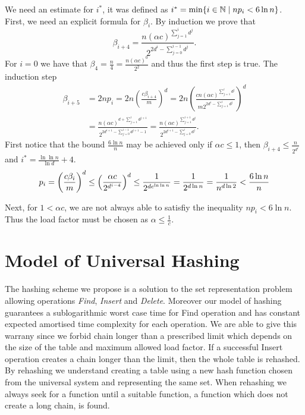 We need an estimate for $i^*$, it was defined as $i^* = \displaystyle\min \{i \in \mathbb{N} \mid np_i < 6 \ln n\}$. First, we need an explicit formula for $\beta_i$. By induction we prove that $$\beta_{i + 4} = \frac{n \left(\alpha c\right) ^ {\sum_{j = 1}^{i}d ^ j}}{2 ^ {2 d ^ i - \sum_{j = 0}^{i - 1}{d ^ j}}} \textit{.}$$
For $i = 0$ we have that $\beta_4 = \frac{n}{4} = \frac{n\left(\alpha c\right) ^ 0}{2 ^ {2}}$ and thus the first step is true. The induction step
\[
\begin{split}
\beta_{i + 5} 
	& = 2np_i = 2n \left(\frac{c\beta_{i + 4}}{m}\right) ^ d = 2n \left(\frac{cn\left(\alpha c\right) ^ {\sum_{j = 1}^{i}d ^ j}}{m 2 ^ {2 d ^ i - \sum_{j = 1}^{i}d^j}}\right) ^ d \\
	& = \frac{n\left(\alpha c\right) ^ {d + \sum_{j = 1}^{i} d ^ {j + 1}}}{2 ^ {2d ^ {i + 1} - \sum_{j = 0}^{i  -1} d ^ {j + 1} - 1}} = \frac{n \left(\alpha c\right) ^ {\sum_{j = 1}^{i + 1} d ^ j}}{2 ^ {2d ^ {i + 1} - \sum_{j = 0}^{i} d ^ j}} \textit{.}
\end{split}
\]
First notice that the bound $\frac{6 \ln n}{n}$ may be achieved only if $\alpha c \leq 1$, then $\beta_{i + 4} \leq \frac{n}{2 ^ {d ^ i}}$ and $i^* = \frac{\ln \ln n}{\ln d} + 4$.
\[
p_i = \left(\frac{c\beta_i}{m}\right) ^ d \leq \left(\frac{\alpha c}{2 ^ {d ^ {i - 4}}}\right) ^ d \leq \frac{1}{2 ^ {de^{\ln \ln n}}} = \frac{1}{2 ^ {d \ln n}} = \frac{1}{n ^ {d \ln 2}} < \frac{6 \ln n}{n}\\
\]

Next, for $1 < \alpha c$, we are not always able to satisfiy the inequality $np_i < 6 \ln n$. Thus the load factor must be chosen as $\alpha \leq \frac{1}{c}$.

\section{Model of Universal Hashing}
The hashing scheme we propose is a solution to the set representation problem allowing operations \emph{Find}, \emph{Insert} and \emph{Delete}. Moreover our model of hashing guarantees a sublogarithmic worst case time for Find operation and has constant expected amortised time complexity for each operation. We are able to give this warrany since we forbid chain longer than a prescribed limit which depends on the size of the table and maximum allowed load factor. If a successful Insert operation creates a chain longer than the limit, then the whole table is rehashed. By rehashing we understand creating a table using a new hash function chosen from the universal system and representing the same set. When rehashing we always seek for a function until a suitable function, a function which does not create a long chain, is found. 

